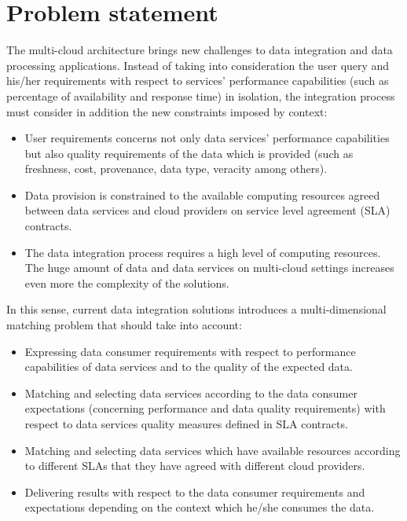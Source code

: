 
\section{Problem statement}
%
The multi-cloud architecture brings new challenges to data integration
and data processing applications.
%
Instead of taking into consideration the user query and his/her requirements
with respect to services' performance capabilities (such as percentage of 
availability and response time) in isolation, the integration process 
must consider in addition the new constraints imposed by context: 
%
\begin{itemize}
\renewcommand{\labelitemi}{$-$}
\item User requirements concerns not only data services' performance 
capabilities but also quality requirements of the data which is provided
(such as freshness, cost, provenance, data type, veracity among others).
%
\item Data provision is constrained to the available computing resources agreed
between data services and cloud providers on service level agreement (SLA) contracts. 
%
\item The data integration process requires a high level of computing resources.
The huge amount of data and data services on multi-cloud settings increases even 
more the complexity of the solutions.
\end{itemize}
%
In this sense, current data integration solutions introduces a multi-dimensional 
matching problem that should take into account:
%
\begin{itemize}
\renewcommand{\labelitemi}{$-$}
\item Expressing data consumer requirements with respect to performance 
capabilities of data services and to the quality of the expected data.
%
\item Matching and selecting data services according to the data consumer expectations 
(concerning performance and data quality requirements) with respect to data 
services quality measures defined in SLA contracts. 
%
\item Matching and selecting data services which have available resources according
to different SLAs that they have agreed with different cloud providers.
%
\item Delivering results with respect to the data consumer requirements and expectations 
depending on the context which he/she consumes the data.
\end{itemize}

